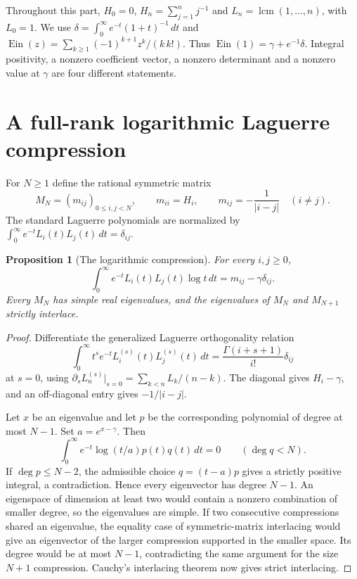 \documentclass[11pt,a4paper]{article}
\newcommand{\Ein}{\operatorname{Ein}}
\newtheorem{proposition}[theorem]{Proposition}
\theoremstyle{definition}
\theoremstyle{remark}
\numberwithin{equation}{section}
\begin{document}
Throughout this part, $H_0=0$, $H_n=\sum_{j=1}^n j^{-1}$ and
$L_n=\operatorname{lcm}(1,\ldots,n)$, with $L_0=1$.  We use
$\delta=\int_0^\infty e^{-t}(1+t)^{-1}\,dt$ and
$\Ein(z)=\sum_{k\ge1}(-1)^{k+1}z^k/(k\,k!)$.
Thus $\Ein(1)=\gamma+e^{-1}\delta$.  Integral positivity, a nonzero
coefficient vector, a nonzero determinant and a nonzero value at $\gamma$
are four different statements.

\section{A full-rank logarithmic Laguerre compression}
\label{ec:laguerre}

For $N\ge1$ define the rational symmetric matrix
\[
 M_N=(m_{ij})_{0\le i,j<N},\qquad
 m_{ii}=H_i,\qquad m_{ij}=-\frac1{|i-j|}\quad(i\ne j).
\]
The standard Laguerre polynomials are normalized by
$\int_0^\infty e^{-t}L_i(t)L_j(t)\,dt=\delta_{ij}$.

\begin{proposition}[The logarithmic compression]
\label{ec:laguerre-identity}
For every $i,j\ge0$,
\[
 \int_0^\infty e^{-t}L_i(t)L_j(t)\log t\,dt
 =m_{ij}-\gamma\delta_{ij}.
\]
Every $M_N$ has simple real eigenvalues, and the eigenvalues of
$M_N$ and $M_{N+1}$ strictly interlace.
\end{proposition}
\begin{proof}
Differentiate the generalized Laguerre orthogonality relation
\[
 \int_0^\infty t^s e^{-t}L_i^{(s)}(t)L_j^{(s)}(t)\,dt
 =\frac{\Gamma(i+s+1)}{i!}\delta_{ij}
\]
at $s=0$, using
$\partial_sL_n^{(s)}|_{s=0}=\sum_{k<n}L_k/(n-k)$.
The diagonal gives $H_i-\gamma$, and an off-diagonal entry gives
$-1/|i-j|$.

Let $x$ be an eigenvalue and let $p$ be the corresponding polynomial of
degree at most $N-1$.  Set $a=e^{x-\gamma}$.  Then
\[
 \int_0^\infty e^{-t}\log(t/a)p(t)q(t)\,dt=0
 \qquad(\deg q<N).
\]
If $\deg p\le N-2$, the admissible choice $q=(t-a)p$ gives a strictly
positive integral, a contradiction.  Hence every eigenvector has degree
$N-1$.  An eigenspace of dimension at least two would contain a nonzero
combination of smaller degree, so the eigenvalues are simple.
If two consecutive compressions shared an eigenvalue, the equality case
of symmetric-matrix interlacing would give an eigenvector of the larger
compression supported in the smaller space.  Its degree would be at most
$N-1$, contradicting the same argument for the size $N+1$ compression.
Cauchy's interlacing theorem now gives strict interlacing.
\end{proof}
\end{document}
